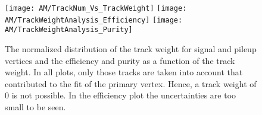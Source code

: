 \begin{figure}[!ht]
    \centering
    \texttt{[image: AM/TrackNum\_Vs\_TrackWeight]}
    \texttt{[image: AM/TrackWeightAnalysis\_Efficiency]}
    \texttt{[image: AM/TrackWeightAnalysis\_Purity]}
    \caption[Distribution of the track weight and efficiency and purity vs track weight]{The normalized distribution of the track weight for signal and pileup vertices and the efficiency and purity as a function of the track weight. In all plots, only those tracks are taken into account that contributed to the fit of the primary vertex. Hence, a track weight of 0 is not possible. In the efficiency plot the uncertainties are too small to be seen.  \label{plot:AMTWdistpureff}}
\end{figure}


